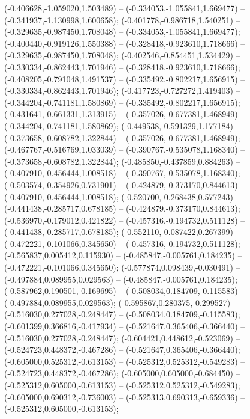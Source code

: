  (-0.406628,-1.059020,1.503489) -- (-0.334053,-1.055841,1.669477) -- (-0.341937,-1.130998,1.600658);
 (-0.401778,-0.986718,1.540251) -- (-0.329635,-0.987450,1.708048) -- (-0.334053,-1.055841,1.669477);
 (-0.400440,-0.919126,1.550388) -- (-0.328418,-0.923610,1.718666) -- (-0.329635,-0.987450,1.708048);
 (-0.402546,-0.854451,1.534429) -- (-0.330334,-0.862443,1.701946) -- (-0.328418,-0.923610,1.718666);
 (-0.408205,-0.791048,1.491537) -- (-0.335492,-0.802217,1.656915) -- (-0.330334,-0.862443,1.701946);
 (-0.417723,-0.727272,1.419403) -- (-0.344204,-0.741181,1.580869) -- (-0.335492,-0.802217,1.656915);
 (-0.431641,-0.661331,1.313915) -- (-0.357026,-0.677381,1.468949) -- (-0.344204,-0.741181,1.580869);
 (-0.449538,-0.591329,1.177184) -- (-0.373658,-0.608782,1.322844) -- (-0.357026,-0.677381,1.468949);
 (-0.467767,-0.516769,1.033039) -- (-0.390767,-0.535078,1.168340) -- (-0.373658,-0.608782,1.322844);
 (-0.485850,-0.437859,0.884263) -- (-0.407910,-0.456444,1.008518) -- (-0.390767,-0.535078,1.168340);
 (-0.503574,-0.354926,0.731901) -- (-0.424879,-0.373170,0.844613) -- (-0.407910,-0.456444,1.008518);
 (-0.520700,-0.268438,0.577243) -- (-0.441438,-0.285717,0.678185) -- (-0.424879,-0.373170,0.844613);
 (-0.536970,-0.179012,0.421822) -- (-0.457316,-0.194732,0.511128) -- (-0.441438,-0.285717,0.678185);
 (-0.552110,-0.087422,0.267399) -- (-0.472221,-0.101066,0.345650) -- (-0.457316,-0.194732,0.511128);
 (-0.565837,0.005412,0.115930) -- (-0.485847,-0.005761,0.184235) -- (-0.472221,-0.101066,0.345650);
 (-0.577874,0.098439,-0.030491) -- (-0.497884,0.089955,0.029563) -- (-0.485847,-0.005761,0.184235);
 (-0.587962,0.190501,-0.169695) -- (-0.508034,0.184709,-0.115583) -- (-0.497884,0.089955,0.029563);
 (-0.595867,0.280375,-0.299527) -- (-0.516030,0.277028,-0.248447) -- (-0.508034,0.184709,-0.115583);
 (-0.601399,0.366816,-0.417934) -- (-0.521647,0.365406,-0.366440) -- (-0.516030,0.277028,-0.248447);
 (-0.604421,0.448612,-0.523069) -- (-0.524723,0.448372,-0.467286) -- (-0.521647,0.365406,-0.366440);
 (-0.605000,0.525312,-0.613153) -- (-0.525312,0.525312,-0.549283) -- (-0.524723,0.448372,-0.467286);
 (-0.605000,0.605000,-0.684450) -- (-0.525312,0.605000,-0.613153) -- (-0.525312,0.525312,-0.549283);
 (-0.605000,0.690312,-0.736003) -- (-0.525313,0.690313,-0.659336) -- (-0.525312,0.605000,-0.613153);

